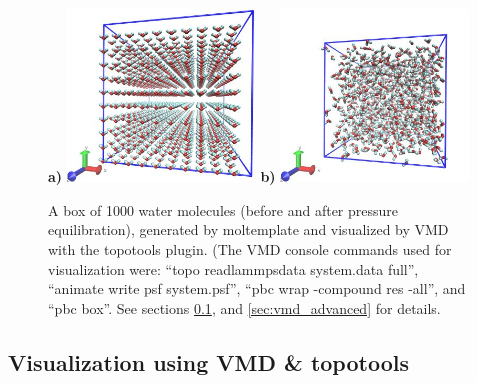 \documentclass[11pt]{article}
\begin{document}
\begin{figure}[htbp]
\centering
\textbf{a)}
\includegraphics[width=5cm]{waterSPCEx1000_LR.jpg}
\textbf{b)}
\includegraphics[width=5cm]{waterSPCEx1000_t=25_LR.jpg}
\caption{
\label{fig:spce_x_1000}
A box of 1000 water molecules (before and after pressure equilibration), 
generated by moltemplate and visualized by VMD with the topotools plugin.
(The VMD console commands used for visualization were:
``topo readlammpsdata system.data full'',
``animate write psf system.psf'',
``pbc wrap -compound res -all'', and 
``pbc box''.
See sections \ref{sec:vmd_topotools}, and \ref{sec:vmd_advanced}
for details.
}
\end{figure}


\subsection{Visualization using VMD \& topotools}
\label{sec:vmd_topotools}
\end{document}
